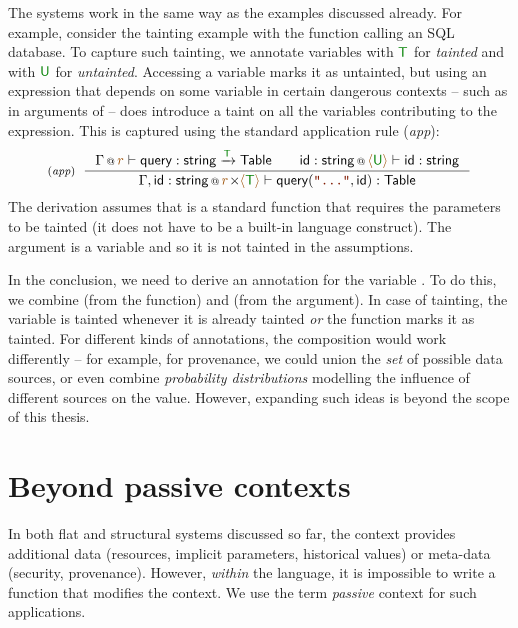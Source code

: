 The systems work in the same way as the examples discussed already. For example, consider the
tainting example with the  function calling an SQL database. To capture such 
tainting, we annotate variables with $\cclrd{\ident{T}}$ for \emph{tainted} and with 
$\cclrd{\ident{U}}$ for \emph{untainted}. Accessing a variable marks it as untainted,
but using an expression that depends on some variable in certain dangerous contexts -- such 
as in arguments of  -- does introduce a taint on all the variables contributing to
the expression. This is captured using the standard application rule (\emph{app}):
%
\begin{equation*}
\tyrule{app}
  { \coctx{\Gamma}{\aclrd{r}} \vdash \ident{query} : \ident{string} \xrightarrow{\cclrd{\ident{T}}} \ident{Table} \qquad
    \coctx{\ident{id}:\ident{string}}{ \alift{\cclrd{\ident{U}}}} \vdash \ident{id} : \ident{string} }
  { \coctx{\Gamma, \ident{id}:\ident{string}}{ \aclrd{r} \cons \alift {\cclrd{\ident{T}}} \vdash \ident{query}(\str{...}, \ident{id}) : \ident{Table} } }
\end{equation*}
%
The derivation assumes that  is a standard function that requires the parameters
to be tainted (it does not have to be a built-in language construct). The argument is a 
variable and so it is not tainted in the assumptions.

In the conclusion, we need to derive an annotation for the variable . To do this, we
combine  (from the function) and  (from the argument). In case
of tainting, the variable is tainted whenever it is already tainted \emph{or} the function marks
it as tainted. For different kinds of annotations, the composition would work differently -- for
example, for provenance, we could union the \emph{set} of possible data sources, or even combine 
\emph{probability distributions} modelling the influence of different sources on the value.
However, expanding such ideas is beyond the scope of this thesis.


\section{Beyond passive contexts}

In both flat and structural systems discussed so far, the context provides additional data (resources, 
implicit parameters, historical values) or meta-data (security, provenance). However, \emph{within} 
the language, it is impossible to write a function that modifies the context. We use the term 
\emph{passive} context for such applications. 

